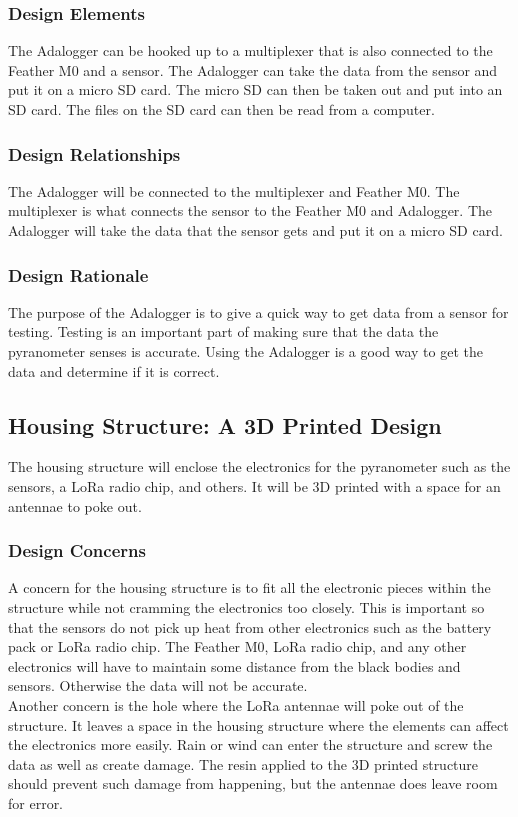 \documentclass[10pt,draftclsnofoot,onecolumn,letterpaper]{article}
\begin{document}
\subsubsection{Design Elements}
The Adalogger can be hooked up to a multiplexer that is also connected to the Feather M0 and a sensor. The Adalogger can take the data from the sensor and put it on a micro SD card. The micro SD can then be taken out and put into an SD card. The files on the SD card can then be read from a computer. 

\subsubsection{Design Relationships}
The Adalogger will be connected to the multiplexer and Feather M0. The multiplexer is what connects the sensor to the Feather M0 and Adalogger. The Adalogger will take the data that the sensor gets and put it on a micro SD card. 

\subsubsection{Design Rationale}
The purpose of the Adalogger is to give a quick way to get data from a sensor for testing. Testing is an important part of making sure that the data the pyranometer senses is accurate. Using the Adalogger is a good way to get the data and determine if it is correct. 

\subsection{Housing Structure: A 3D Printed Design}
The housing structure will enclose the electronics for the pyranometer such as the sensors, a LoRa radio chip, and others. It will be 3D printed with a space for an antennae to poke out. 

\subsubsection{Design Concerns}
A concern for the housing structure is to fit all the electronic pieces within the structure while not cramming the electronics too closely. This is important so that the sensors do not pick up heat from other electronics such as the battery pack or LoRa radio chip. The Feather M0, LoRa radio chip, and any other electronics will have to maintain some distance from the black bodies and sensors. Otherwise the data will not be accurate.\\
Another concern is the hole where the LoRa antennae will poke out of the structure. It leaves a space in the housing structure where the elements can affect the electronics more easily. Rain or wind can enter the structure and screw the data as well as create damage. The resin applied to the 3D printed structure should prevent such damage from happening, but the antennae does leave room for error. 
\end{document}
